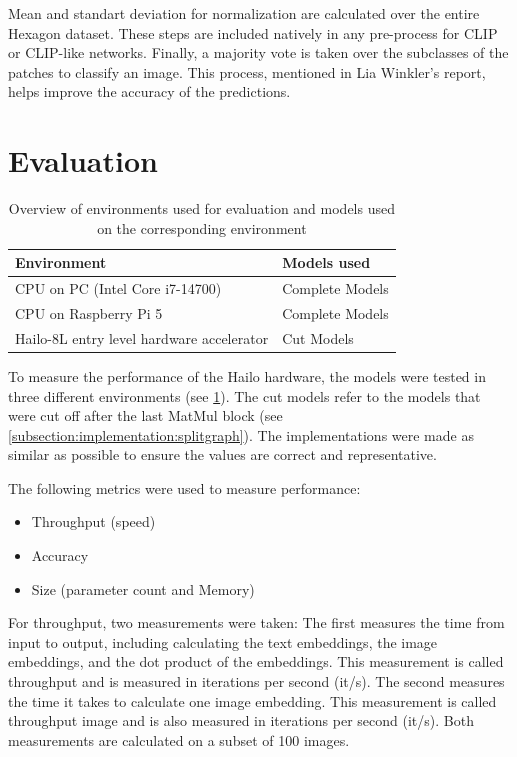 Mean and standart deviation for normalization are calculated over the entire Hexagon dataset.
These steps are included natively in any pre-process for CLIP or CLIP-like networks.
Finally, a majority vote is taken over the subclasses of the patches to classify an image. 
This process, mentioned in Lia Winkler's report, helps improve the accuracy of the predictions.

\section{Evaluation}
\begin{table}[h!]
    \centering
    \begin{tabular}{l|l}
    \hline
    Environment &  Models used\\
    \hline
    CPU on PC (Intel Core i7-14700) &  Complete Models\\
    CPU on Raspberry Pi 5 &  Complete Models\\
    Hailo-8L entry level hardware accelerator & Cut Models
    \end{tabular}
    \caption{Overview of environments used for evaluation and models used on the corresponding environment}
    \label{tab:implementation:platform}
\end{table}

To measure the performance of the Hailo hardware, the models were tested in three different environments (see \cref{tab:implementation:platform}).
The cut models refer to the models that were cut off after the last MatMul block (see \cref{subsection:implementation:splitgraph}).
The implementations were made as similar as possible to ensure the values are correct and representative. 

The following metrics were used to measure performance:
\begin{itemize}
    \item Throughput (speed)
    \item Accuracy
    \item Size (parameter count and Memory)
\end{itemize}

For throughput, two measurements were taken:
The first measures the time from input to output, including calculating the text embeddings, the image embeddings, and the dot product of the embeddings. This measurement is called throughput and is measured in iterations per second (it/s).
The second measures the time it takes to calculate one image embedding. This measurement is called throughput image and is also measured in iterations per second (it/s).
Both measurements are calculated on a subset of 100 images.

